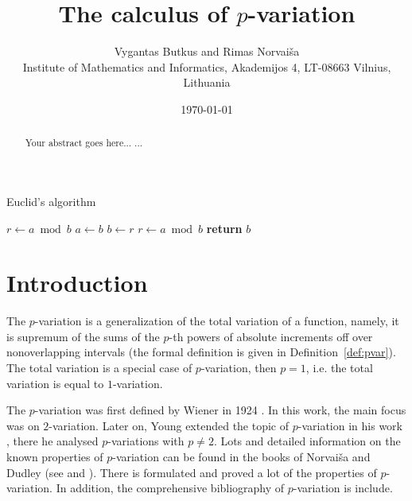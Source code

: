 \documentclass[12pt, a4paper]{article}
\title{The calculus of $p$-variation }
\author{Vygantas Butkus and Rimas Norvaiša \\
\small{Institute of Mathematics and Informatics, Akademijos 4, LT-08663 Vilnius, Lithuania}}
\date{\today}
\numberwithin{equation}{section}
\begin{document}
  \maketitle

\begin{algorithm}
\caption{Euclid’s algorithm}\label{euclid}
\begin{algorithmic}[1]
\State $r\gets a\bmod b$
\State $a\gets b$
\State $b\gets r$
\State $r\gets a\bmod b$
\EndWhile\label{euclidendwhile}
\State \textbf{return} $b$
\EndProcedure
\end{algorithmic}
\end{algorithm}

\begin{abstract}
Your abstract goes here...
...
\end{abstract}



\section{Introduction}


The $p$-variation is a generalization of the total variation of a function,
namely, it is supremum of the sums of the $p$-th
powers of absolute increments off over nonoverlapping intervals 
(the formal definition is given in Definition~\ref{def:pvar}).
The total variation is a special case of $p$-variation, then 
$p=1$, i.e. the total variation is equal to $1$-variation.

The $p$-variation was first defined by Wiener in 1924 \cite{Wiener1924}.
In this work, the main focus was on $2$-variation. 
Later on, Young extended
the topic of $p$-variation in his work \cite{Young1936}, there 
he analysed $p$-variations with $p \neq 2$. 
Lots and detailed information on the known properties 
of $p$-variation can be found in the books of  Norvaiša and
Dudley (see \cite{DudleyNorvaisa1998} and \cite{DudleyNorvaisa1999}). 
There is formulated and proved a lot of the properties of $p$-variation.
In addition, the comprehensive bibliography of $p$-variation is include.
\end{document}
